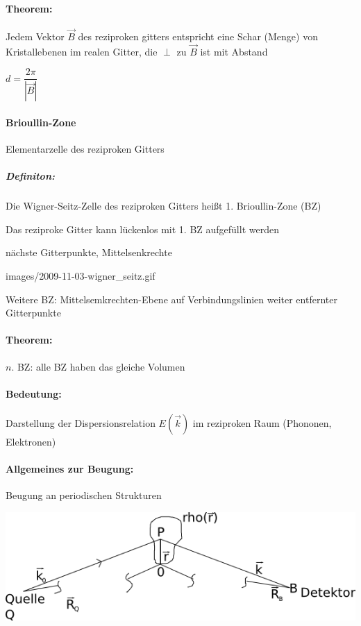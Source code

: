 \nr
\paragraph{Theorem: }

Jedem Vektor $\vec{B}$ des reziproken gitters entspricht eine Schar
(Menge) von Kristallebenen im realen Gitter, die $\perp$ zu $\vec{B}$
ist mit Abstand 

$d=\dfrac{2\pi}{\left|\vec{B}\right|}$ 


\paragraph{Brioullin-Zone\label{par:Brioullin-Zone}}

Elementarzelle des reziproken Gitters


\subparagraph{Definiton:}

Die Wigner-Seitz-Zelle des reziproken Gitters hei\ss t 1. Brioullin-Zone
(BZ) 

Das reziproke Gitter kann l\"uckenlos mit 1. BZ aufgef\"ullt werden

n\"achste Gitterpunkte, Mittelsenkrechte

images/2009-11-03-wigner\_seitz.gif

Weitere BZ: Mittelsemkrechten-Ebene auf Verbindungslinien weiter
entfernter Gitterpunkte


\paragraph{Theorem:}

$n$. BZ: alle BZ haben das gleiche Volumen


\paragraph{Bedeutung:}

Darstellung der Dispersionsrelation $E\left(\vec{k}\right)$ im reziproken
Raum (Phononen, Elektronen)


\paragraph{Allgemeines zur Beugung:}

Beugung an periodischen Strukturen

\includegraphics[scale=1]{images/2009-11-03-2-beugung.png}

